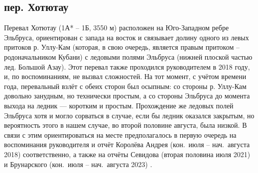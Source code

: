 \subsection{пер. Хотютау} 
Перевал Хотютау (1А* -- 1Б, 3550 м) расположен на Юго-Западном ребре Эльбруса, ориентирован с запада на восток и связывает долину одного из левых притоков р. Уллу-Кам (которая, в свою очередь, является правым притоком -- родоначальником Кубани) с ледовыми полями Эльбруса (нижней плоской частью лед. Большой Азау). Этот перевал также проходился руководителем в 2018 году, и, по воспоминаниям, не вызвал сложностей. На тот момент, с учётом времени года, перевальный взлёт с обеих сторон был осыпным: со стороны р. Уллу-Кам довольно занудным, но технически простым, а со стороны Эльбруса до момента выхода на ледник --- коротким и простым. Прохождение же ледовых полей Эльбруса хотя и могло сорваться в случае, если бы ледник оказался закрытым, но вероятность этого в нашем случае, во второй половине августа, была низкой. В связи с этим ориентироваться на месте предполагалось в первую очередь на воспоминания руководителя и отчёт Королёва Андрея (кон.~июля -- нач.~августа 2018) \cite{Korolyov2018} соответственно, а также на отчёты Севидова (вторая половина июля 2021) \cite{Sevidov2021} и Брунарского (кон.~июля -- нач.~августа 2023) \cite{Brunarsky2023}.